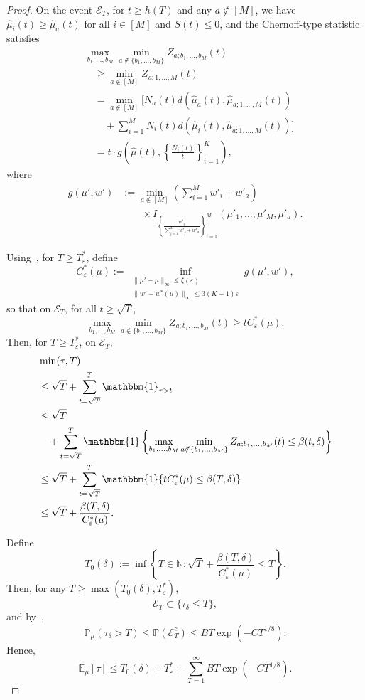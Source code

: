 \documentclass[final]{IEEEtran}
\newcommand{\nn}{\nonumber}
\begin{document}
\begin{proof}
On the event $\mathcal{E}_T$, for $t \geq h(T)$ and any $a \notin [M]$, we have $\hat{\mu}_i(t) \geq \hat{\mu}_a(t)$ for all $i \in [M]$ and $S(t) \leq 0$, and the Chernoff-type statistic satisfies
\begin{align}
&\max_{b_1,\dots,b_M} \min_{a \notin \{b_1,\dots,b_M\}} Z_{a; b_1,\dots,b_M}(t)\nn\\
&\quad \geq \min_{a \notin [M]} Z_{a;1,\dots,M}(t) \\
&\quad = \min_{a \notin [M]} \big[ N_a(t) d(\hat{\mu}_a(t), \hat{\mu}_{a;1,\dots,M}(t)) \nn\\
&\qquad + \sum_{i=1}^M N_i(t) d(\hat{\mu}_i(t), \hat{\mu}_{a;1,\dots,M}(t)) \big] \\
&\quad = t \cdot g\left(\hat{\mu}(t), \left\{ \frac{N_i(t)}{t} \right\}_{i=1}^K \right),
\end{align}
where
\begin{align}
g(\mu', w') &:= \min_{a \notin [M]} \left( \sum_{i=1}^M w'_i + w'_a \right)\nn\\
&\qquad \times I_{\left\{ \frac{w'_i}{\sum_{j=1}^M w'_j + w'_a} \right\}_{i=1}^M}(\mu'_1,\dots,\mu'_M, \mu'_a).
\end{align}

Using~\cite[Lemma 20]{garivier2016optimal}, for $T \geq T_\varepsilon^*$, define
\[
C^*_\varepsilon(\mu) := \inf_{\substack{\|\mu' - \mu\|_\infty \leq \xi(\varepsilon)\\ \|w' - w^*(\mu)\|_\infty \leq 3(K-1)\varepsilon}} g(\mu', w'),
\]
so that on $\mathcal{E}_T$, for all $t \geq \sqrt{T}$,
\[
\max_{b_1,\dots,b_M} \min_{a \notin \{b_1,\dots,b_M\}} Z_{a; b_1,\dots,b_M}(t) \geq t C^*_\varepsilon(\mu).
\]
Then, for $T \geq T_\varepsilon^*$, on $\mathcal{E}_T$,
\begin{align}
&\min(\tau, T)\nn\\
&\leq \sqrt{T} + \sum_{t = \sqrt{T}}^T \mathbbm{1}_{\tau > t} \\
&\leq \sqrt{T} \nn\\
&\quad + \sum_{t = \sqrt{T}}^T \mathbbm{1}\left\{ \max_{b_1,\dots,b_M} \min_{a \notin \{b_1,\dots,b_M\}} Z_{a; b_1,\dots,b_M}(t) \leq \beta(t,\delta) \right\} \\
&\leq \sqrt{T} + \sum_{t = \sqrt{T}}^T \mathbbm{1}\{ t C^*_\varepsilon(\mu) \leq \beta(T,\delta) \} \\
&\leq \sqrt{T} + \frac{\beta(T,\delta)}{C^*_\varepsilon(\mu)}.
\end{align}

Define
\[
T_0(\delta) := \inf\left\{ T \in \mathbb{N} : \sqrt{T} + \frac{\beta(T,\delta)}{C^*_\varepsilon(\mu)} \leq T \right\}.
\]
Then, for any $T \geq \max(T_0(\delta), T_\varepsilon^*)$,
\[
\mathcal{E}_T \subset \{ \tau_\delta \leq T \},
\]
and by~\cite[Lemma 19]{garivier2016optimal},
\[
\mathbb{P}_\mu(\tau_\delta > T) \leq \mathbb{P}(\mathcal{E}_T^c) \leq B T \exp(-C T^{1/8}).
\]
Hence,
\[
\mathbb{E}_\mu[\tau] \leq T_0(\delta) + T_\varepsilon^* + \sum_{T=1}^\infty B T \exp(-C T^{1/8}).
\]


\end{proof}
\end{document}
